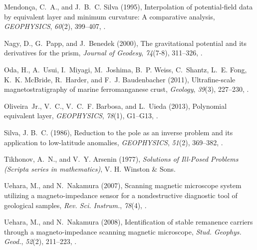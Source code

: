 \documentclass[draft,gc]{agutex}
\begin{document}
\begin{article}
\begin{thebibliography}{39}
Mendon\c{c}a, C.~A., and J.~B.~C. Silva (1995), Interpolation of
  potential‐field data by equivalent layer and minimum curvature: A
  comparative analysis, \textit{GEOPHYSICS}, \textit{60}(2), 399--407,
  .

Nagy, D., G.~Papp, and J.~Benedek (2000), The gravitational potential and its
  derivatives for the prism, \textit{Journal of Geodesy}, \textit{74}(7-8),
  311--326, .

Oda, H., A.~Usui, I.~Miyagi, M.~Joshima, B.~P. Weiss, C.~Shantz, L.~E. Fong,
  K.~K. McBride, R.~Harder, and F.~J. Baudenbacher (2011), Ultrafine-scale
  magnetostratigraphy of marine ferromanganese crust, \textit{Geology},
  \textit{39}(3), 227--230, .

Oliveira~Jr., V.~C., V.~C.~F. Barbosa, and L.~Uieda (2013), Polynomial
  equivalent layer, \textit{GEOPHYSICS}, \textit{78}(1), G1--G13,
  .

Silva, J. B.~C. (1986), Reduction to the pole as an inverse problem and its
  application to low-latitude anomalies, \textit{GEOPHYSICS}, \textit{51}(2),
  369--382, .

Tikhonov, A.~N., and V.~Y. Arsenin (1977), \textit{Solutions of Ill-Posed
  Problems (Scripta series in mathematics)}, V. H. Winston \& Sons.

Uehara, M., and N.~Nakamura (2007), Scanning magnetic microscope system
  utilizing a magneto-impedance sensor for a nondestructive diagnostic tool of
  geological samples, \textit{Rev. Sci. Instrum.}, \textit{78}(4),
  .

Uehara, M., and N.~Nakamura (2008), Identification of stable remanence carriers
  through a magneto-impedance scanning magnetic microscope, \textit{Stud.
  Geophys. Geod.}, \textit{52}(2), 211--223, .


\end{thebibliography}
\end{article}
\end{document}
